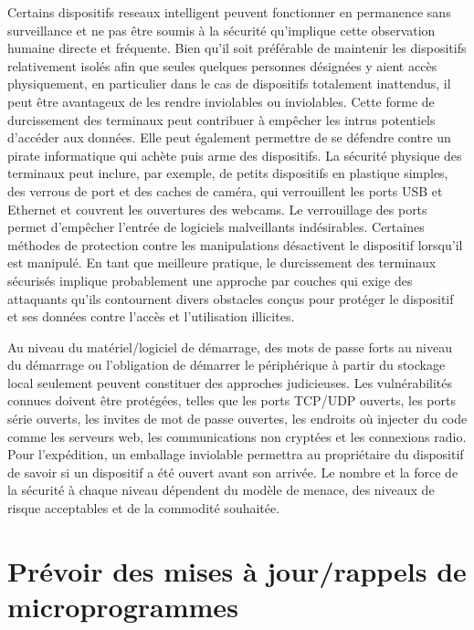 \documentclass[12pt]{report}
\begin{document}
Certains dispositifs reseaux intelligent peuvent fonctionner en permanence sans
surveillance et ne pas être soumis à la sécurité qu'implique cette
observation humaine directe et fréquente. Bien qu'il soit préférable de
maintenir les dispositifs relativement isolés afin que seules quelques
personnes désignées y aient accès physiquement, en particulier dans le
cas de dispositifs totalement inattendus, il peut être avantageux de les
rendre inviolables ou inviolables. Cette forme de durcissement des
terminaux peut contribuer à empêcher les intrus potentiels d'accéder aux
données. Elle peut également permettre de se défendre contre un pirate
informatique qui achète puis arme des dispositifs. La sécurité physique
des terminaux peut inclure, par exemple, de petits dispositifs en
plastique simples, des verrous de port et des caches de caméra, qui
verrouillent les ports USB et Ethernet et couvrent les ouvertures des
webcams. Le verrouillage des ports permet d'empêcher l'entrée de
logiciels malveillants indésirables. Certaines méthodes de protection
contre les manipulations désactivent le dispositif lorsqu'il est
manipulé. En tant que meilleure pratique, le durcissement des terminaux
sécurisés implique probablement une approche par couches qui exige des
attaquants qu'ils contournent divers obstacles conçus pour protéger le
dispositif et ses données contre l'accès et l'utilisation illicites.


Au niveau du matériel/logiciel de démarrage, des mots de passe forts au
niveau du démarrage ou l'obligation de démarrer le périphérique à partir
du stockage local seulement peuvent constituer des approches
judicieuses. Les vulnérabilités connues doivent être protégées, telles
que les ports TCP/UDP ouverts, les ports série ouverts, les invites de
mot de passe ouvertes, les endroits où injecter du code comme les
serveurs web, les communications non cryptées et les connexions radio.
Pour l'expédition, un emballage inviolable permettra au propriétaire du
dispositif de savoir si un dispositif a été ouvert avant son arrivée. Le
nombre et la force de la sécurité à chaque niveau dépendent du modèle de
menace, des niveaux de risque acceptables et de la commodité souhaitée.

\hypertarget{pruxe9voir-des-mises-uxe0-jourrappels-de-microprogrammes}{%
      \section{\texorpdfstring{Prévoir des mises à jour/rappels de
              microprogrammes
        }{Prévoir des mises à jour/rappels de microprogrammes }}\label{pruxe9voir-des-mises-uxe0-jourrappels-de-microprogrammes}}
\end{document}
